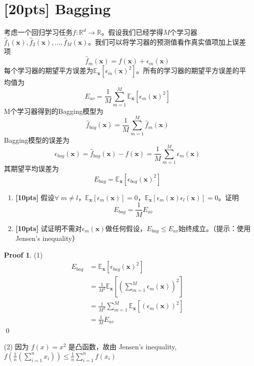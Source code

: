 \documentclass[a4paper,UTF8]{article}
\numberwithin{equation}{section}
\theoremstyle{definition}
\newtheorem*{prove}{Proof}
\begin{document}
\section{[20pts] Bagging}
考虑一个回归学习任务$f:\mathbb{R}^d \rightarrow \mathbb{R}$。假设我们已经学得$M$个学习器$\hat{f}_1(\mathbf{x}),\hat{f}_2(\mathbf{x}),\dots,\hat{f}_M(\mathbf{x})$。我们可以将学习器的预测值看作真实值项加上误差项
\begin{equation}
\hat{f}_m(\mathbf{x})=f(\mathbf{x})+\epsilon_m(\mathbf{x})
\end{equation}
每个学习器的期望平方误差为$\mathbb{E}_{\mathbf{x}}[\epsilon_m(\mathbf{x})^2]$。所有的学习器的期望平方误差的平均值为
\begin{equation}
E_{av}=\frac{1}{M}\sum_{m=1}^M \mathbb{E}_{\mathbf{x}}[\epsilon_m(\mathbf{x})^2]
\end{equation}
M个学习器得到的Bagging模型为
\begin{equation}
\hat{f}_{bag}(\mathbf{x})=\frac{1}{M}\sum_{m=1}^M \hat{f}_m(\mathbf{x})
\end{equation}
Bagging模型的误差为
\begin{equation}
\epsilon_{bag}(\mathbf{x})=\hat{f}_{bag}(\mathbf{x})-f(\mathbf{x})=\frac{1}{M}\sum_{m=1}^M \epsilon_m(\mathbf{x})
\end{equation}
其期望平均误差为
\begin{equation}
E_{bag}=\mathbb{E}_{\mathbf{x}}[\epsilon_{bag}(\mathbf{x})^2]
\end{equation}
\begin{enumerate}[ {(}1{)}]
\item \textbf{[10pts]} 假设$\forall\; m\neq l$，$ \mathbb{E}_{\mathbf{x}}[\epsilon_m(\mathbf{x})]=0$，$ \mathbb{E}_{\mathbf{x}}[\epsilon_m(\mathbf{x})\epsilon_l(\mathbf{x})]=0$。证明
\begin{equation}
E_{bag}=\frac{1}{M} E_{av}
\end{equation}

\item  \textbf{[10pts]} 试证明不需对$\epsilon_m(\mathbf{x})$做任何假设，$E_{bag}\leq E_{av}$始终成立。（提示：使用Jensen's inequality）
\end{enumerate}

\begin{prove} %
(1) 
\begin{equation}
\begin{split}
E_{bag} &=\mathbb{E}_{\mathbf{x}}[\epsilon_{bag}(\mathbf{x})^2]  \\
&= \frac{1}{M^2} \mathbb{E}_{\mathbf{x}}[(\sum_{m=1}^M \epsilon_m(\mathbf{x}))^2]  \\
&= \frac{1}{M^2} \sum_{m=1}^M \mathbb{E}_{\mathbf{x}}[( \epsilon_m(\mathbf{x}))^2]  \\
&=  \frac{1}{M} E_{av}
\end{split}
\end{equation}
\qed
\end{prove}
(2) %
因为 $f(x) = x^2$ 是凸函数，故由 Jensen's inequality,  $f(\frac{1}{n} (\sum_{i=1}^{n}x_i )) \leq \frac{1}{n} \sum_{i=1}^{n}f(x_i) $
\end{document}
